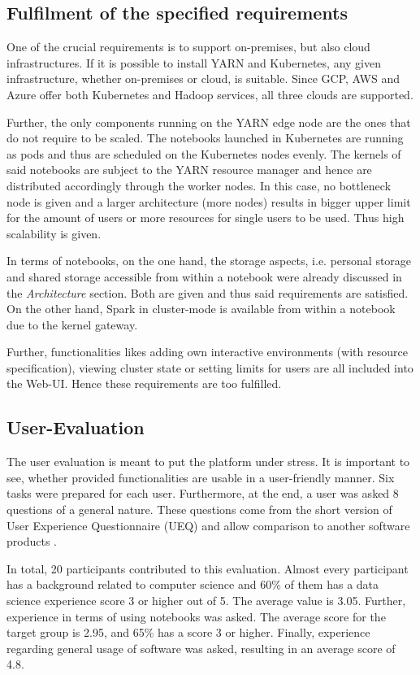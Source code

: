 \documentclass[a4paper,twoside]{article}
\begin{document}
\subsection{Fulfilment of the specified requirements}

One of the crucial requirements is to support on-premises, but also cloud infrastructures. If it is possible to install YARN and Kubernetes,
any given infrastructure, whether on-premises or cloud, is suitable. Since GCP, AWS and Azure offer both Kubernetes and Hadoop services, all three clouds are supported. 

Further, the only components running on the YARN edge node are the ones that do not require to be scaled. The notebooks launched in Kubernetes are running as pods and thus are scheduled on the Kubernetes nodes evenly. The kernels of said notebooks are subject to the YARN resource manager and hence are distributed accordingly through the worker nodes. In this case, no bottleneck node is given and a larger architecture (more nodes) results in bigger upper limit for the amount of users or more resources for single users to be used. Thus high scalability is given. 

In terms of notebooks, on the one hand, the storage aspects, i.e. personal storage and shared storage accessible from within a notebook were already discussed in the \textit{Architecture} section. Both are given and thus said requirements are satisfied. On the other hand, Spark in cluster-mode is available from within a notebook due to the kernel gateway. 

Further, functionalities likes adding own interactive environments (with resource specification), viewing cluster state or setting limits for users are all included into the Web-UI. Hence these requirements are too fulfilled.

\subsection{User-Evaluation}

The user evaluation is meant to put the platform under stress. It is important to see, whether provided functionalities are usable in a user-friendly manner. Six tasks were prepared for each user. Furthermore, at the end, a user was asked 8 questions of a general nature. These questions come from the short version of User Experience Questionnaire (UEQ) and allow comparison to another software products \cite{schrepp2014applying}.

In total, 20 participants contributed to this evaluation.  Almost every participant has a background related to computer science and 60\% of them has a data science experience score 3 or higher out of 5. The average value is 3.05. Further, experience in terms of using notebooks was asked. The average score for the target group is 2.95, and 65\% has a score 3 or higher. Finally, experience regarding general usage of software was asked, resulting in an average score of 4.8.
\end{document}
